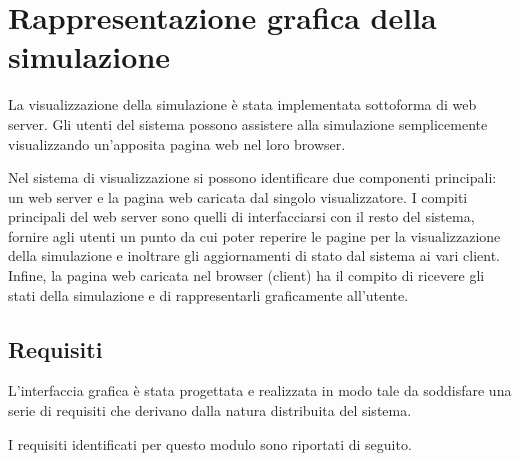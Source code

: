 \section{Rappresentazione grafica della simulazione}
La visualizzazione della simulazione è stata implementata sottoforma di web
server. Gli utenti del sistema possono assistere alla simulazione semplicemente
visualizzando un'apposita pagina web nel loro browser.

Nel sistema di visualizzazione si possono identificare due componenti
principali: un web server e la pagina web caricata dal singolo visualizzatore.
I compiti principali del web server sono quelli di interfacciarsi con il resto
del sistema, fornire agli utenti un punto da cui poter reperire le pagine per la
visualizzazione della simulazione e inoltrare gli aggiornamenti di stato dal
sistema ai vari client.
Infine, la pagina web caricata nel browser (client) ha il compito di ricevere
gli stati della simulazione e di rappresentarli graficamente all'utente.

\subsection{Requisiti}\label{subsec:requisiti}
L'interfaccia grafica è stata progettata e realizzata in modo tale da
soddisfare una serie di requisiti che derivano dalla natura distribuita del
sistema. 

I requisiti identificati per questo modulo sono riportati di seguito.

